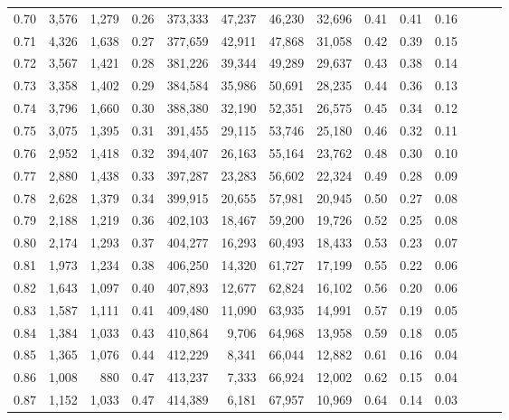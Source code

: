 \begin{tabular}{rrrrrrrrrrrrrr}
0.70 &   3,576 &  1,279 &  0.26 &  373,333 &   47,237 &  46,230 &  32,696 &  0.41 &  0.41 &      0.16 \\
0.71 &   4,326 &  1,638 &  0.27 &  377,659 &   42,911 &  47,868 &  31,058 &  0.42 &  0.39 &      0.15 \\
0.72 &   3,567 &  1,421 &  0.28 &  381,226 &   39,344 &  49,289 &  29,637 &  0.43 &  0.38 &      0.14 \\
0.73 &   3,358 &  1,402 &  0.29 &  384,584 &   35,986 &  50,691 &  28,235 &  0.44 &  0.36 &      0.13 \\
0.74 &   3,796 &  1,660 &  0.30 &  388,380 &   32,190 &  52,351 &  26,575 &  0.45 &  0.34 &      0.12 \\
0.75 &   3,075 &  1,395 &  0.31 &  391,455 &   29,115 &  53,746 &  25,180 &  0.46 &  0.32 &      0.11 \\
0.76 &   2,952 &  1,418 &  0.32 &  394,407 &   26,163 &  55,164 &  23,762 &  0.48 &  0.30 &      0.10 \\
0.77 &   2,880 &  1,438 &  0.33 &  397,287 &   23,283 &  56,602 &  22,324 &  0.49 &  0.28 &      0.09 \\
0.78 &   2,628 &  1,379 &  0.34 &  399,915 &   20,655 &  57,981 &  20,945 &  0.50 &  0.27 &      0.08 \\
0.79 &   2,188 &  1,219 &  0.36 &  402,103 &   18,467 &  59,200 &  19,726 &  0.52 &  0.25 &      0.08 \\
0.80 &   2,174 &  1,293 &  0.37 &  404,277 &   16,293 &  60,493 &  18,433 &  0.53 &  0.23 &      0.07 \\
0.81 &   1,973 &  1,234 &  0.38 &  406,250 &   14,320 &  61,727 &  17,199 &  0.55 &  0.22 &      0.06 \\
0.82 &   1,643 &  1,097 &  0.40 &  407,893 &   12,677 &  62,824 &  16,102 &  0.56 &  0.20 &      0.06 \\
0.83 &   1,587 &  1,111 &  0.41 &  409,480 &   11,090 &  63,935 &  14,991 &  0.57 &  0.19 &      0.05 \\
0.84 &   1,384 &  1,033 &  0.43 &  410,864 &    9,706 &  64,968 &  13,958 &  0.59 &  0.18 &      0.05 \\
0.85 &   1,365 &  1,076 &  0.44 &  412,229 &    8,341 &  66,044 &  12,882 &  0.61 &  0.16 &      0.04 \\
0.86 &   1,008 &    880 &  0.47 &  413,237 &    7,333 &  66,924 &  12,002 &  0.62 &  0.15 &      0.04 \\
0.87 &   1,152 &  1,033 &  0.47 &  414,389 &    6,181 &  67,957 &  10,969 &  0.64 &  0.14 &      0.03 \\

\end{tabular}
